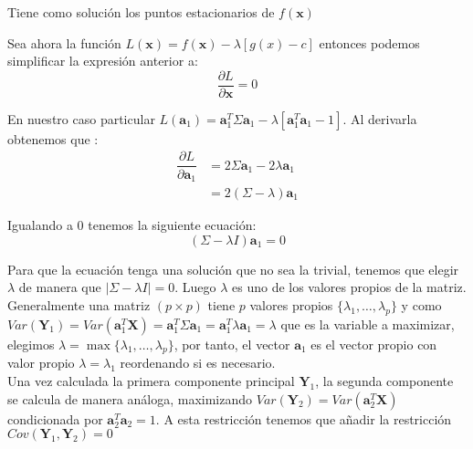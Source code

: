\noindent Tiene como solución los puntos estacionarios de $f(\textbf{x})$

\newpage
Sea ahora la función $L(\textbf{x})= f(\textbf{x})-\lambda[g(x)-c]$  entonces podemos simplificar la expresión anterior a:
\begin{equation}
\dfrac{\partial L}{\partial \textbf{x}}=0
\end{equation}

\noindent En nuestro caso particular $L(\textbf{a}_1)=\textbf{a}_1^T \Sigma \textbf{a}_1 - \lambda[\textbf{a}_1^T \textbf{a}_1-1]$. Al derivarla obtenemos que :
\begin{align*}
\dfrac{\partial L}{\partial \textbf{a}_1} &= 2\Sigma \textbf{a}_1 - 2\lambda\textbf{a}_1\\
& = 2(\Sigma-\lambda)\textbf{a}_1 
\end{align*}

\noindent Igualando a 0 tenemos la siguiente ecuación: 
\begin{equation}
(\Sigma-\lambda I)\textbf{a}_1=0
\end{equation}

\noindent Para que la ecuación tenga una solución que no sea la trivial, tenemos que elegir $\lambda$ de manera que $|\Sigma-\lambda I| = 0$. Luego $\lambda$ es uno de los valores propios de la matriz. Generalmente una matriz $(p\times p)$ tiene $p$ valores propios $\lbrace\lambda_1, \ldots ,\lambda_p \rbrace$ y como $Var(\textbf{Y}_1)=Var(\textbf{a}_1^T\textbf{X})= \textbf{a}_1^T \Sigma \textbf{a}_1 =\textbf{a}_1^T \lambda \textbf{a}_1=\lambda$ que es la variable a maximizar, elegimos $\lambda=\max \lbrace\lambda_1, \ldots ,\lambda_p \rbrace$, por tanto, el vector $\textbf{a}_1$ es el vector propio con valor propio $\lambda=\lambda_1$ reordenando si es necesario.\\

\noindent Una vez calculada la primera componente principal $\textbf{Y}_1$, la segunda componente se calcula de manera análoga, maximizando $Var(\textbf{Y}_2)=Var(\textbf{a}_2^T\textbf{X})$ condicionada por $\textbf{a}_2^T\textbf{a}_2=1$. A esta restricción tenemos que añadir la restricción $Cov(\textbf{Y}_1,\textbf{Y}_2)=0 $

